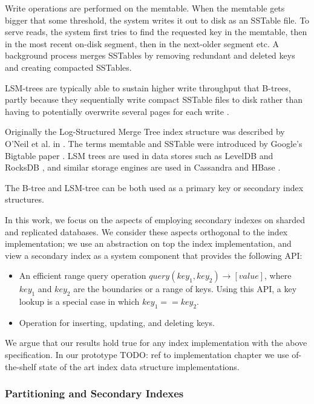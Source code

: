 Write operations are performed on the memtable.
When the memtable gets bigger that some threshold, the system writes it out to disk as an SSTable file.
To serve reads, the system first tries to find the requested key in the memtable, then in the most recent on-disk segment,
then in the next-older segment etc.
A background process merges SSTables by removing redundant and deleted keys and creating compacted SSTables.

LSM-trees are typically able to sustain higher write throughput that B-trees, partly because they sequentially write
compact SSTable files to disk rather than having to potentially overwrite several pages for each write \cite{lsm:vsbtree}.

Originally the Log-Structured Merge Tree index structure was described by O'Neil et al. in \cite{oneil:lsmtree}.
The terms memtable and SSTable were introduced by Google's Bigtable paper \cite{chang:bigtable}.
LSM trees are used in data stores such as LevelDB \cite{leveldb:implnotes} and RocksDB \cite{rocksdb:history},
and similar storage engines are used in Cassandra and HBase \cite{hbase:hfile}.

\bigskip
\noindent
The B-tree and LSM-tree can be both used as a primary key or secondary index structures.

In this work, we focus on the aspects of employing secondary indexes on sharded and replicated databases.
We consider these aspects orthogonal to the index implementation;
we use an abstraction on top the index implementation, and view a secondary index as a system component that provides
the following API:
\begin{itemize}
  \item An efficient range query operation $query(key_1, key_2) \rightarrow [value]$,
  where $key_1$ and $key_2$ are the boundaries or a range of keys.
  Using this API, a key lookup is a special case in which $key_1 == key_2$.

  \item Operation for inserting, updating, and deleting keys.
\end{itemize}
We argue that our results hold true for any index implementation with the above specification.
In our prototype
TODO: ref to implementation chapter
we use of-the-shelf state of the art index data structure implementations.

\subsubsection{Partitioning and Secondary Indexes}

